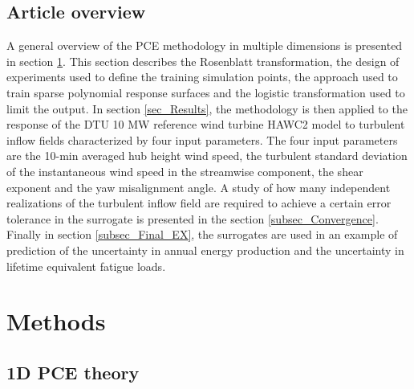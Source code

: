 \documentclass[preprint,12pt]{elsarticle}
\begin{document}


\subsection{Article overview}

A general overview of the PCE methodology in multiple dimensions is presented in section \ref{sec_Methods}. This section describes the Rosenblatt transformation, the design of experiments used to define the training simulation points, the approach used to train sparse polynomial response surfaces and the logistic transformation used to limit the output. In section \ref{sec_Results}, the methodology is then applied to the response of the DTU 10 MW reference wind turbine HAWC2 model \cite{bak2012light} to turbulent inflow fields characterized by four input parameters. The four input parameters are the 10-min averaged hub height wind speed, the turbulent standard deviation of the instantaneous wind speed in the streamwise component, the shear exponent and the yaw misalignment angle. A study of how many independent realizations of the turbulent inflow field are required to achieve a certain error tolerance in the surrogate is presented in the section \ref{subsec_Convergence}. Finally in section \ref{subsec_Final_EX}, the surrogates are used in an example of prediction of the uncertainty in annual energy production and the uncertainty in lifetime equivalent fatigue loads.

\section{Methods}
\label{sec_Methods}

\subsection{1D PCE theory}

\end{document}
